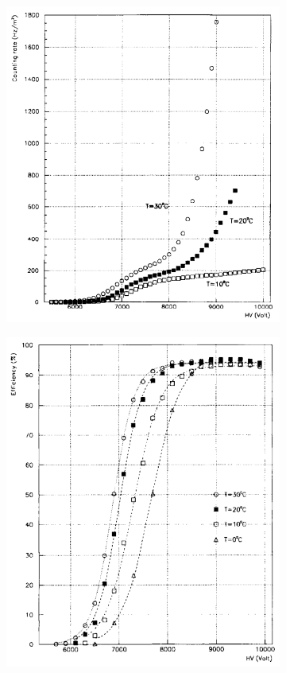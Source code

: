 	\begin{figure}[H]
		\begin{subfigure}{0.5\linewidth}
			\centering
			\includegraphics[width = 0.58\plotwidth]{fig/chapt4/Rate-temperature.png}\\
			\caption{\label{fig:TCorr:A}}
		\end{subfigure}
		\begin{subfigure}{0.5\linewidth}
		    \centering
			\includegraphics[width = 0.58\plotwidth]{fig/chapt4/Efficiency-temperature.png}

\end{subfigure}
\end{figure}
